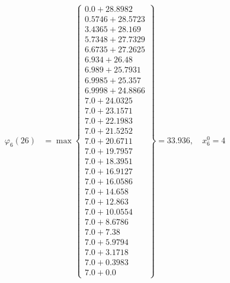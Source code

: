 \documentclass{article}
\begin{document}
\begin{align*}
  
\varphi_{6}(26) &= \max \left\{ \begin{array}{c}
0.0 + 28.8982 \\
 0.5746 + 28.5723 \\
 3.4365 + 28.169 \\
 5.7348 + 27.7329 \\
 6.6735 + 27.2625 \\
 6.934 + 26.48 \\
 6.989 + 25.7931 \\
 6.9985 + 25.357 \\
 6.9998 + 24.8866 \\
 7.0 + 24.0325 \\
 7.0 + 23.1571 \\
 7.0 + 22.1983 \\
 7.0 + 21.5252 \\
 7.0 + 20.6711 \\
 7.0 + 19.7957 \\
 7.0 + 18.3951 \\
 7.0 + 16.9127 \\
 7.0 + 16.0586 \\
 7.0 + 14.658 \\
 7.0 + 12.863 \\
 7.0 + 10.0554 \\
 7.0 + 8.6786 \\
 7.0 + 7.38 \\
 7.0 + 5.9794 \\
 7.0 + 3.1718 \\
 7.0 + 0.3983 \\
 7.0 + 0.0
\end{array} \right\}=33.936,\quad x_{6}^0=4\\
  
  
  

\end{align*}
\end{document}
